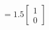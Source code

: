 \documentclass[preview]{standalone}
\begin{document}
\begin{align*}
= 1.5 \begin{bmatrix} 1 \\ 0 \end{bmatrix}
\end{align*}
\end{document}
